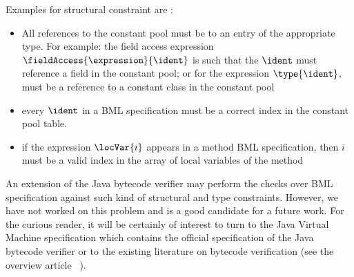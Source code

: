 Examples for structural constraint are :
\begin{itemize}
    \item All references to the constant pool must be to an entry of the appropriate type. For example:
          the field access expression  $\fieldAccess{\expression}{\ident}$ is such that the
	  $\ident$ must reference a field in the constant pool; or for the expression $\type{\ident}$, \ident
	  must be a reference to a constant class in the constant pool
    
    \item every $\ident$ in a BML specification must be a correct index in the constant pool table. 
    
    \item if the  expression $\locVar{i}$ appears in a method BML specification, then
          $i$ must be a valid index in the array of local variables of the method
\end{itemize}

An extension of the Java bytecode verifier may perform the checks
 over BML specification against such kind of structural and type constraints.
However, we have not worked on this problem and is a good candidate for a future work.
For the curious reader, it will be certainly of interest to turn to the Java Virtual Machine 
specification \cite{VMSpec} which contains the official
 specification of the Java bytecode verifier    
or to the existing literature on bytecode verification (see the overview article ~\cite{Ljbc}).
 







